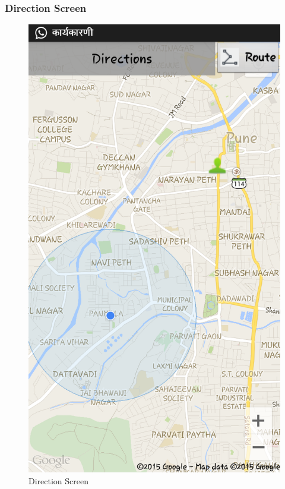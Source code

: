 \documentclass[12pt,a4paper]{article}
\begin{document}
\subsubsection{Direction Screen}
\begin{figure}[!htb]
\centering
\includegraphics[width=12 cm]{directions}
\caption{Direction Screen}
\end{figure}
\\
\end{document}
